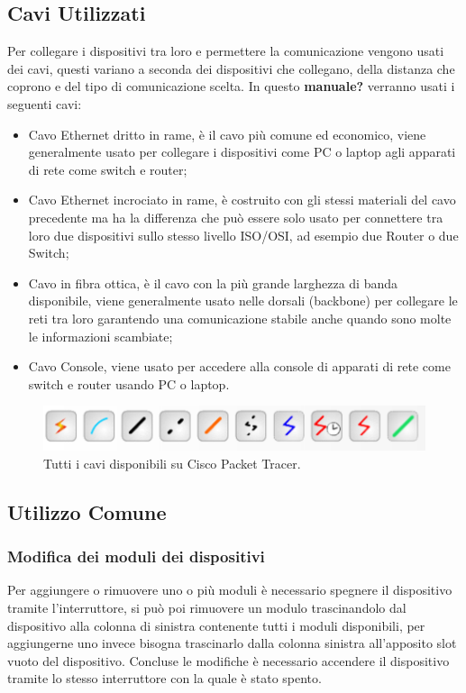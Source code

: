 \subsection{Cavi Utilizzati}
Per collegare i dispositivi tra loro e permettere la comunicazione vengono usati dei cavi, questi variano a seconda dei dispositivi che collegano, della distanza che coprono e del tipo di comunicazione scelta.\newline
\smallskip
\newline
In questo \textbf{manuale?} verranno usati i seguenti cavi:

\begin{itemize}
    \item Cavo Ethernet dritto in rame, è il cavo più comune ed economico, viene generalmente usato per collegare i dispositivi come PC o laptop agli apparati di rete come switch e router;
    \item Cavo Ethernet incrociato in rame, è costruito con gli stessi materiali del cavo precedente ma ha la differenza che può essere solo usato per connettere tra loro due dispositivi sullo stesso livello ISO/OSI, ad esempio due Router o due Switch;
    \item Cavo in fibra ottica, è il cavo con la più grande larghezza di banda disponibile, viene generalmente usato nelle dorsali (backbone) per collegare le reti tra loro garantendo una comunicazione stabile anche quando sono molte le informazioni scambiate;
    \item Cavo Console, viene usato per accedere alla console di apparati di rete come switch e router usando PC o laptop.
\end{itemize}

\begin{figure}[htbp]
    \centerline{\includegraphics[scale=.4]{images/02.packet-tracer/cavi.png}}
    \caption{Tutti i cavi disponibili su Cisco Packet Tracer.}
\end{figure}

\subsection{Utilizzo Comune}

\subsubsection{Modifica dei moduli dei dispositivi}
Per aggiungere o rimuovere uno o più moduli è necessario spegnere il dispositivo tramite l'interruttore, si può poi rimuovere un modulo trascinandolo dal dispositivo alla colonna di sinistra contenente tutti i moduli disponibili, per aggiungerne uno invece bisogna trascinarlo dalla colonna sinistra all'apposito slot vuoto del dispositivo. Concluse le modifiche è necessario accendere il dispositivo tramite lo stesso interruttore con la quale è stato spento.


